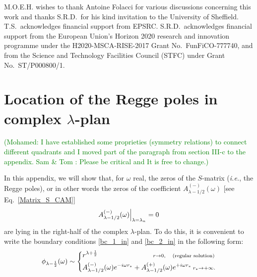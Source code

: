 \documentclass[aps,prd,longbibliography,reprint,twocolumn,amsmath,amssymb,amsfonts,showpacs,footnote,superscriptaddress]{revtex4-1}%
\newcommand{\moh}[1]{\textcolor{green}{(Mohamed: #1)}}
\begin{document}
\acknowledgments
M.O.E.H. wishes to thank Antoine Folacci for various discussions concerning this work and thanks S.R.D.~for his kind
invitation to the University of Sheffield. T.S.~acknowledges financial support from EPSRC. S.R.D.~acknowledges financial support from the European Union's Horizon 2020 research and innovation programme under the H2020-MSCA-RISE-2017 Grant No.~FunFiCO-777740, and from the Science and Technology Facilities Council (STFC) under Grant No.~ST/P000800/1.


\appendix

\section{Location of the Regge poles in complex $\lambda$-plan}
\label{appen}

\moh{I have established some proprieties (symmetry relations) to connect different quadrants and I moved part of the paragraph from section III-c to the appendix.  Sam \& Tom : Please be critical and It is free to change.}

In this appendix, we will show that, for $\omega$ real, the zeros of the $S$-matrix (\textit{i.e.}, the Regge poles), or in other words
the zeros of the coefficient $A^{(-)}_{\lambda-1/2} (\omega)$ [see Eq.~\eqref{Matrix_S_CAM}]
\begin{equation}\label{zeros_Am}
   A^{(-)}_{\lambda-1/2} (\omega)\Big{|}_{\lambda =\lambda_n} = 0
\end{equation}
are lying in the right-half of the complex $\lambda$-plan. To do this, it is convenient to write the boundary conditions \eqref{bc_1_in} and \eqref{bc_2_in} in the following form:
\begin{equation}
\label{bc_CAM}
\phi_{\lambda-\frac{1}{2}}(\omega) \sim
\left\{
\begin{aligned}
&r^{\lambda+\frac{1}{2}}\hspace{8em} \scriptstyle{r \rightarrow 0,} \quad \text{(regular solution)}\\
&A_{\lambda-1/2}^{(-)}(\omega) e^{-i\omega r_*} + A_{\lambda-1/2}^{(+)}(\omega) e^{+i\omega r_*}  \hspace{0.2em}\scriptstyle{r_* \rightarrow +\infty.}
\end{aligned}
\right.
\end{equation}
\end{document}
